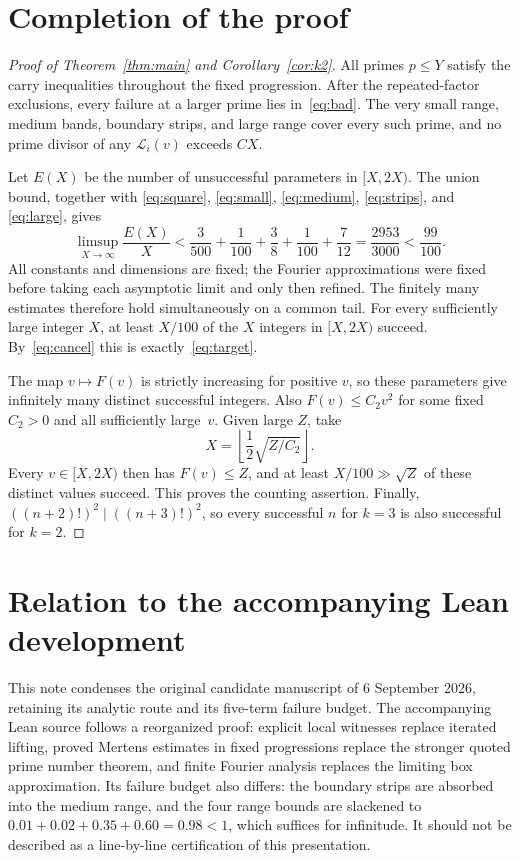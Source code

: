 \documentclass[11pt,a4paper]{article}
\newcommand{\LL}{\mathcal L}
\newcommand{\1}{\mathbf 1}
\numberwithin{equation}{section}
\begin{document}
\section{Completion of the proof}\label{sec:completion}

\begin{proof}[Proof of Theorem~\ref{thm:main} and Corollary~\ref{cor:k2}]
All primes \(p\leq Y\) satisfy the carry inequalities throughout the
fixed progression. After the repeated-factor exclusions, every failure
at a larger prime lies in~\eqref{eq:bad}. The very small range, medium
bands, boundary strips, and large range cover every such prime, and no
prime divisor of any \(\LL_i(v)\) exceeds \(CX\).

Let \(E(X)\) be the number of unsuccessful parameters in \([X,2X)\).
The union bound, together with \eqref{eq:square}, \eqref{eq:small},
\eqref{eq:medium}, \eqref{eq:strips}, and \eqref{eq:large}, gives
\begin{equation}\label{eq:budget}
 \limsup_{X\to\infty}\frac{E(X)}X
 <\frac3{500}+\frac1{100}+\frac38+\frac1{100}+\frac7{12}
 =\frac{2953}{3000}<\frac{99}{100}.
\end{equation}
All constants and dimensions are fixed; the Fourier approximations were
fixed before taking each asymptotic limit and only then refined. The
finitely many estimates therefore hold simultaneously on a common tail.
For every sufficiently large integer \(X\), at least \(X/100\) of the
\(X\) integers in \([X,2X)\) succeed. By~\eqref{eq:cancel} this is
exactly~\eqref{eq:target}.

The map \(v\mapsto F(v)\) is strictly increasing for positive \(v\), so
these parameters give infinitely many distinct successful integers.
Also \(F(v)\leq C_2v^2\) for some fixed \(C_2>0\) and all sufficiently
large~\(v\). Given large \(Z\), take
\[
 X=\left\lfloor\frac12\sqrt{Z/C_2}\right\rfloor.
\]
Every \(v\in[X,2X)\) then has \(F(v)\leq Z\), and at least
\(X/100\gg\sqrt Z\) of these distinct values succeed. This proves the
counting assertion. Finally, \(((n+2)!)^2\mid((n+3)!)^2\), so every
successful \(n\) for \(k=3\) is also successful for \(k=2\).
\end{proof}

\section*{Relation to the accompanying Lean development}

This note condenses the original candidate manuscript of 6 September 2026,
retaining its analytic route and its five-term failure budget. The accompanying
Lean source follows a reorganized proof: explicit local witnesses replace
iterated lifting, proved Mertens estimates in fixed progressions replace the
stronger quoted prime number theorem, and finite Fourier analysis replaces
the limiting box approximation. Its failure budget also differs: the boundary
strips are absorbed into the medium range, and the four range bounds are
slackened to \(0.01+0.02+0.35+0.60=0.98<1\), which suffices for infinitude.
It should not be described as a line-by-line certification of this
presentation.
\end{document}
